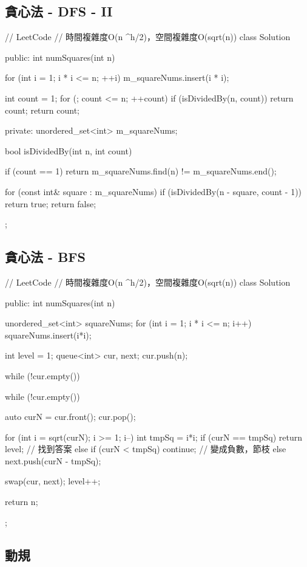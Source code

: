 \subsection{貪心法 - DFS - II}
\begin{Code}
// LeetCode
// 時間複雜度O(n ^h/2)，空間複雜度O(sqrt(n))
class Solution {
public:
    int numSquares(int n) {
        for (int i = 1; i * i <= n; ++i)
            m_squareNums.insert(i * i);

        int count = 1;
        for (; count <= n; ++count) {
            if (isDividedBy(n, count))
                return count;
        }
        return count;
    }
private:
    unordered_set<int> m_squareNums;

    bool isDividedBy(int n, int count)
    {
        if (count == 1)
            return m_squareNums.find(n) != m_squareNums.end();

        for (const int& square : m_squareNums) {
            if (isDividedBy(n - square, count - 1))
                return true;
        }
        return false;
    }
};
\end{Code}

\subsection{貪心法 - BFS}
\begin{Code}
// LeetCode
// 時間複雜度O(n ^h/2)，空間複雜度O(sqrt(n))
class Solution {
public:
    int numSquares(int n) {
        unordered_set<int> squareNums;
        for (int i = 1; i * i <= n; i++)
            squareNums.insert(i*i);

        int level = 1;
        queue<int> cur, next;
        cur.push(n);

        while (!cur.empty())
        {
            while (!cur.empty())
            {
                auto curN = cur.front();
                cur.pop();

                for (int i = sqrt(curN); i >= 1; i--)
                {
                    int tmpSq = i*i;
                    if (curN == tmpSq) return level; // 找到答案
                    else if (curN < tmpSq) continue; // 變成負數，節枝
                    else
                        next.push(curN - tmpSq);
                }
            }

            swap(cur, next);
            level++;
        }

        return n;
    }
};
\end{Code}

\subsection{動規}

